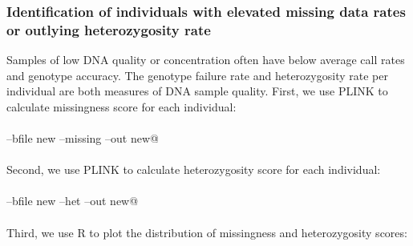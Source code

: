 \documentclass{article}\usepackage[]{graphicx}\usepackage[]{color}
\begin{document}
\subsubsection{Identification of individuals with elevated missing data rates or outlying heterozygosity rate}
Samples of low DNA quality or concentration often have below average call rates and genotype accuracy. The genotype failure rate and heterozygosity rate per individual are both measures of DNA sample quality. First, we use PLINK to calculate missingness score for each individual:
\\\\\verb@plink --bfile new --missing --out new@\\\\
Second, we use PLINK to calculate heterozygosity score for each individual:
\\\\\verb@plink --bfile new --het --out new@\\\\
Third, we use R to plot the distribution of missingness and heterozygosity scores:
\end{document}
